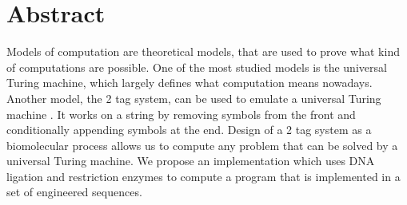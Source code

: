 \documentclass[
11pt, %
a4paper, %
oneside, %
headinclude,footinclude, %
BCOR5mm, %
]{scrartcl}
\title{\normalfont\spacedallcaps{Designing a Molecular 2-Tag System}} %
\author{\spacedlowsmallcaps{Nicolas Ochsner, Miroslav Phan}} %
\date{} %
\begin{document}

\renewcommand{\sectionmark}[1]{\markright{\spacedlowsmallcaps{#1}}} %
\lehead{\mbox{\llap{\small\thepage\kern1em\color{halfgray} \vline}\color{halfgray}\hspace{0.5em}\rightmark\hfil}} %

\pagestyle{scrheadings} %



\maketitle %

\setcounter{tocdepth}{2} %

\tableofcontents %




\section*{Abstract} %

Models of computation are theoretical models, that are used to prove what kind
of computations are possible. One of the most studied models is the universal
Turing machine, which largely defines what computation means nowadays. Another
model, the 2 tag system, can be used to emulate a universal Turing machine \cite{Cocke1964}. It
works on a string by removing symbols from the front and conditionally appending
symbols at the end. Design of a 2 tag system as a biomolecular process allows us
to compute any problem that can be solved by a universal Turing machine. We
propose an implementation which uses DNA ligation and restriction enzymes to
compute a program that is implemented in a set of engineered sequences.
\end{document}

